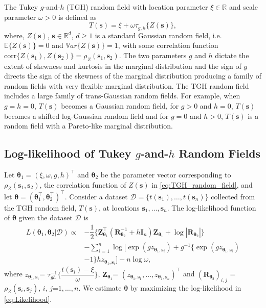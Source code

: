 \documentclass[conference]{IEEEtran}
\begin{document}
The Tukey $g$-and-$h$ (TGH) random field with location parameter $\xi \in \mathbb{R}$ and scale parameter $\omega > 0$ is defined as 
\begin{equation}\label{eq:TGH_random_field}
T(\bm s) = \xi + \omega \tau_{g,h}\{Z(\bm s)\},
\end{equation}
where, $Z(\bm s)$, $\bm s \in \mathbb{R}^d$, $d \geq 1$ is a standard Gaussian random field, i.e. $\mathbb{E}\{Z(\bm s)\} = 0$ and $\mathbb{V}ar\{Z(\bm s)\} = 1$, with some correlation function $\text{corr}\{Z(\bm s_1),Z(\bm s_2)\} = \rho_Z(\bm s_1,\bm s_2)$. The two parameters $g$ and $h$ dictate the extent of skewness and kurtosis in the marginal distribution and the sign of $g$ directs the sign of the skewness of the marginal distribution producing a family of random fields with very flexible marginal distribution. The TGH random field includes a large family of trans-Gaussian random fields. For example, when $g=h=0$, $T(\bm s)$ becomes a Gaussian random field, for $g>0$ and $h=0$, $T(\bm s)$ becomes a shifted log-Gaussian random field and for $g = 0$ and $h>0$, $T(\bm s)$ is a random field with a Pareto-like marginal distribution.
\subsection{Log-likelihood of Tukey $g$-and-$h$ Random Fields}
Let $\bm \theta_1 = (\xi,\omega,g,h)^\top$ and $\bm \theta_2$ be the parameter vector corresponding to $ \rho_Z(\bm s_1,\bm s_2)$, the correlation function of $Z(\bm s)$ in \eqref{eq:TGH_random_field}, and let $\bm \theta = (\bm \theta_1^\top,\bm \theta_2^\top)^\top$. Consider a dataset $\mathcal{D} = \{t(\bm s_1),\ldots,t(\bm s_n)\}$ collected from the TGH random field, $T(\bm s)$,  at locations $\bm s_1,\ldots,\bm s_n$. The  log-likelihood function of $\bm \theta$ given the dataset $\mathcal{D}$ is
\begin{equation}
\begin{split}
L(\bm{\theta}_1,\bm{\theta}_2|\mathcal{D})  \propto &-\dfrac{1}{2} \{ \bm{Z}_{\bm{\theta}_1}^\top (\bm{R}_{\bm{\theta}_2}^{-1} + h\bm{I}_n)\bm{Z}_{\bm{\theta}_1} + \log | \bm{R}_{\bm{\theta}_2}| \} \\&- \sum_{i=1}^n \log [ \exp(g z_{\bm{\theta}_1,\bm{s}_i})+g^{-1} \{ \exp(g z_{\bm{\theta}_1,\bm{s}_i})\\& -1 \} h z_{\bm{\theta}_1,\bm{s}_i}] -n \log \omega, 
\end{split}
\label{eq:Likelihood}
\end{equation}
where $z_{\bm{\theta}_1,\bm{s}_i}$= $\tau_{gh}^{-1} \bigg \{ \dfrac{t(\bm{s}_i) - \xi}{\omega} \bigg \}$, $\bm{Z}_{\bm{\theta}_1} $= $(z_{\bm{\theta}_1,\bm{s}_1},\ldots,z_{\bm{\theta}_1,\bm{s}_n})^\top$ and ${(\bm{R}_{\bm{\theta}_2})}_{i,j}$ = $\rho_Z(\bm{s}_i,\bm{s}_j)$, $ i$, $ j$=$1,\ldots,n$. We estimate $ \bm \theta$ by maximizing the log-likelihood in \eqref{eq:Likelihood}.
\end{document}
